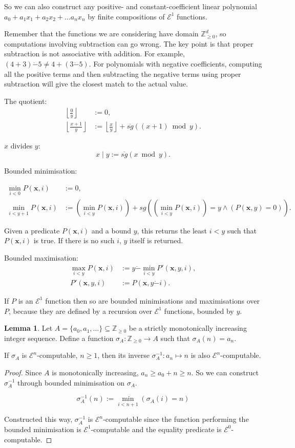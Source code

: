 \documentclass[a4paper]{article}
\newcommand{\grz}[1]{$\mathcal{E}^{#1}$}	%
\newcommand{\Zpos}{\mathbb{Z}_{\geq 0}}
\newcommand{\xvec}{\mathbf{x}}	%
\newcommand{\psub}{\dot -}	%
\newcommand{\rsg}{\overline{sg}} %
\newcommand{\recur}[1]{\begin{equation} \begin{split} #1 \end{split} \end{equation}}	%
\theoremstyle{plain}
\theoremstyle{definition}
\newtheorem{lemma}[theorem]{Lemma}
\begin{document}
	So we can also construct any positive- and constant-coefficient linear polynomial $a_0 + a_1x_1 + a_2x_2 + \dots a_nx_n$ by finite compositions of \grz{1} functions. 

Remember that the functions we are considering have domain $\Zpos^d$, so computations involving subtraction can go wrong. The key point is that proper subtraction is not associative with addition. For example, $(4+3) \psub 5 \neq 4+(3 \psub 5)$. For polynomials with negative coefficients, computing all the positive terms and then subtracting the negative terms using proper subtraction will give the closest match to the actual value.

The quotient:
\recur{
	\left \lfloor \frac{0}{y} \right \rfloor &:= 0, \\
	\left \lfloor \frac{x+1}{y} \right \rfloor &:= \left \lfloor \frac{x}{y} \right \rfloor + \rsg\left( (x+1) \bmod{y} \right).
}

$x$ divides $y$:
\begin{equation} x \mid y := \rsg( x \bmod{y} ). \end{equation}

Bounded minimisation: 

\recur{
	\min_{i < 0} P(\xvec,i) &:= 0,	\\
	\min_{i < y+1} P(\xvec,i) &:= \left( \min_{i  < y} P(\xvec,i) \right) + sg\left( (\min_{i<y}P(\xvec,i))=y \wedge (P(\xvec,y) = 0) \right).
}

Given a predicate $P(\xvec,i)$ and a bound $y$, this returns the least $i<y$ such that $P(\xvec,i)$ is true. If there is no such $i$, $y$ itself is returned.

Bounded maximisation:
\recur{
	\max_{i < y} P(\xvec,i) &:= y \psub \min_{i < y} P'(\xvec, y, i), \\
	P'(\xvec,y,i) &:= P(\xvec, y \psub i).
}

If $P$ is an \grz{1} function then so are bounded minimisations and maximisations over $P$, because they are defined by a recursion over \grz{1} functions, bounded by $y$.

\begin{lemma}
	Let $A = \{a_0, a_1, \dots\} \subseteq \Zpos$ be a strictly monotonically increasing integer sequence. Define a function $\sigma_A : \Zpos \to A$ such that $\sigma_A(n) = a_n$.
	
	If $\sigma_A$ is \grz{n}-computable, $n \geq 1$, then its inverse $\sigma_A^{-1} : a_n \mapsto n$ is also \grz{n}-computable. 
\end{lemma}
\begin{proof}
	Since $A$ is monotonically increasing, $a_n \geq a_0 + n \geq n$. So we can construct $\sigma_A^{-1}$ through bounded minimisation on $\sigma_A$.

	\[ \sigma_A^{-1}(n) := \min_{i < n+1}{\left( \sigma_A(i) = n \right)} \]

	Constructed this way, $\sigma_A^{-1}$ is \grz{n}-computable since the function performing the bounded minimisation is \grz{1}-computable and the equality predicate is \grz{0}-computable. 
\end{proof}
\end{document}
